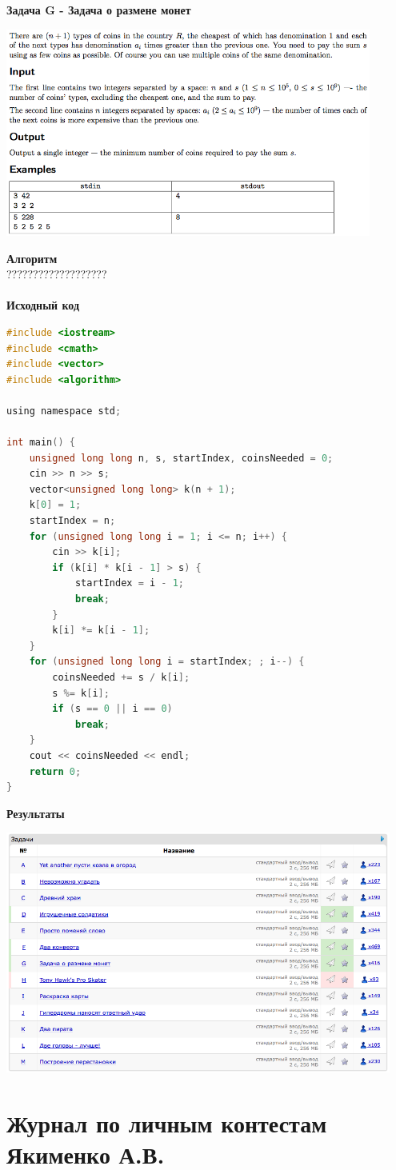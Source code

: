 \documentclass[a4paper,12pt]{article}
\begin{document}
\newpage
\textbf{{\large Задача G - Задача о размене монет}} \\
\begin{center}
\includegraphics[width=0.9\textwidth]{CT_SGAU/CT_SGAU_G.png}\\ [1cm]
\end{center}
\textbf{{\large Алгоритм}} \\
{\Huge ???????????????????} \\ 
\\
\newpage
\textbf{{\large Исходный код}}
\begin{lstlisting}[language=C]
#include <iostream>
#include <cmath>
#include <vector>
#include <algorithm>

using namespace std;

int main() {
    unsigned long long n, s, startIndex, coinsNeeded = 0;
    cin >> n >> s;
    vector<unsigned long long> k(n + 1);
    k[0] = 1;
    startIndex = n;
    for (unsigned long long i = 1; i <= n; i++) {
        cin >> k[i];
        if (k[i] * k[i - 1] > s) {
            startIndex = i - 1;
            break;
        }
        k[i] *= k[i - 1];
    }
    for (unsigned long long i = startIndex; ; i--) {
        coinsNeeded += s / k[i];
        s %= k[i];
        if (s == 0 || i == 0)
            break;
    }
    cout << coinsNeeded << endl;
    return 0;
}
\end{lstlisting}

\newpage
\textbf{{\large Результаты}} \\
\begin{center}
\includegraphics[width=0.95\textwidth]{CT_SGAU/CT_SGAU_result.png}\\ [1cm]
\end{center}



\newpage
\section{Журнал по личным контестам Якименко А.В.}
\end{document}
